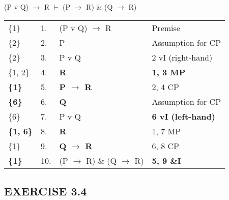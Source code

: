 \documentclass[a4paper,12pt]{article}
\newcommand{\mra}{$\rightarrow$ }
\newcommand{\mvd}{$\vdash$ }
\begin{document}
    \begin{enumerate}[label=\arabic*,leftmargin=*]

        \begin{minipage}{\textwidth}
        \item (P v Q) \mra R \mvd (P \mra R) \& (Q \mra R)
            \nopagebreak
            \vspace{1em}\\
            \begin{tabular}{l l l l}
                \{1\} & 1. & (P v Q) \mra R & Premise\\
                \{2\} & 2. & P & Assumption for CP\\
                \{2\} & 3. & P v Q & 2 vI (right-hand)\\
                \{1, 2\} & 4. & \textbf{R} & \textbf{1, 3 MP} \\
                \textbf{\{1\}} & 5. & \textbf{P \mra R} & 2, 4 CP \\
                \textbf{\{6\}} & 6. & \textbf{Q} & Assumption for CP \\
                \{6\} & 7. & P v Q & \textbf{6 vI (left-hand)} \\
                \textbf{\{1, 6\}} & 8. & \textbf{R} & 1, 7 MP \\
                \{1\} & 9. & \textbf{Q \mra R} & 6, 8 CP \\
                \textbf{\{1\}} & 10. & (P \mra R) \& (Q \mra R) & \textbf{5, 9 \&I} \\
            \end{tabular}
        \end{minipage}

    \end{enumerate}

    \subsection*{EXERCISE 3.4}
\end{document}
